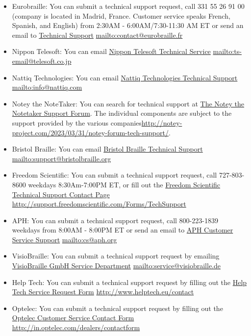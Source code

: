 \documentclass[12pt,letterpaper,twoside,openright]{report}
\begin{document}
\begin{appendices}
\begin{itemize}[leftmargin=*]
\item Eurobraille: You can submit a technical support request, call 331 55 26 91 00 (company is located in Madrid, France. Customer service speaks French, Spanish, and English) from 2:30AM - 6:00AM/7:30-11:30 AM ET or send an email to \href{mailto:econtact@eurobraille.fr}{Technical Support}  \break\url{mailto:contact@eurobraille.fr}
\item Nippon Telesoft: You can email \href{mailto:ts-email@telesoft.co.jp}{Nippon Telesoft Technical Service}  \break\url{mailto:ts-email@telesoft.co.jp}
\item Nattiq Technologies: You can email \href{mailto:info@nattiq.com}{Nattiq Technologies Technical Support}  \break\url{mailto:info@nattiq.com}
\item Notey the NoteTaker: You can search for technical support at \href{http://notey-project.com/2023/03/31/notey-forum-tech-support/}{The Notey the Notetaker Support Forum}. The individual components are subject to the support provided by the various companies\break\url{http://notey-project.com/2023/03/31/notey-forum-tech-support/}. 
\item Bristol Braille: You can email \href{mailto:support@bristolbraille.org}{Bristol Braille Technical Support}  \break\url{mailto:support@bristolbraille.org}
\item Freedom Scientific: You can submit a technical support request, call 727-803-8600 weekdays 8:30Am-7:00PM ET, or fill out the \href{http://support.freedomscientific.com/Forms/TechSupport}{Freedom Scientific Technical Support Contact Page}  \break\url{http://support.freedomscientific.com/Forms/TechSupport}
\item APH: You can submit a technical support request, call 800-223-1839 weekdays from 8:00AM - 8:00PM ET or send an email to \href{mailto:cs@aph.org}{APH Customer Service Support}  \break\url{mailto:cs@aph.org}
\item VisioBraille: You can submit a technical support request by emailing \href{mailto:service@visiobraille.de}{VisioBraille GmbH Service Department}  \break\url{mailto:service@visiobraille.de}
\item Help Tech: You can submit a technical support request by filling out the \href{http://www.helptech.eu/contact}{Help Tech Service Request Form}  \break\url{http://www.helptech.eu/contact}
\item Optelec: You can submit a technical support request by filling out the \href{http://in.optelec.com/dealers/contactform}{Optelec Customer Service Contact Form}  \break\url{http://in.optelec.com/dealers/contactform}
\end{itemize}


\end{appendices}
\end{document}
